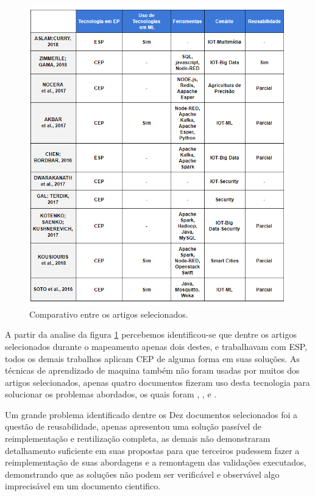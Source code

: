 \documentclass[tid,table]{texufpel} %
\begin{document}
\begin{figure}[h]
	\centering
	\includegraphics[width=1\textwidth]{imagens/comparacaoArtigos.png}
	\caption{Comparativo entre os artigos selecionados.}
	\label{fig:comparacaoArtigos}
\end{figure}






A partir da analise da figura \ref{fig:comparacaoArtigos} percebemos identificou-se que dentre os artigos selecionados durante o mapeamento apenas dois destes, \cite{art1aslam2018towards} e \cite{art5chen2016dress} trabalhavam com ESP, todos os demais trabalhos aplicam CEP de alguma forma em suas soluções. As técnicas de aprendizado de maquina também não foram usadas por muitos dos artigos selecionados, apenas quatro documentos fizeram uso desta tecnologia para solucionar os problemas abordados, os quais foram \cite{art1aslam2018towards}, \cite{art4akbar2017predictive}, \cite{art9kousiouris2018integrated} e \cite{art10soto2016ceml}. 

Um grande problema identificado dentre os Dez documentos selecionados foi a questão de reusabilidade, apenas \cite{art2zimmerle2018web} apresentou uma solução passível de reimplementação e reutilização completa, as demais não demonstraram detalhamento suficiente em suas propostas para que terceiros pudessem  fazer a reimplementação de suas abordagens e a remontagem das validações executados, demonstrando que as soluções não podem ser verificável e observável algo imprecisável em um documento cientifico. 
\end{document}
